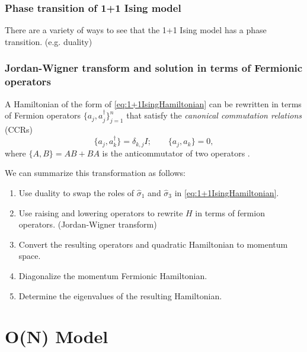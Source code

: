\documentclass[11pt,reqno]{amsart}
\begin{document}
    \subsubsection{Phase transition of 1+1 Ising model}
    
    There are a variety of ways to see that the 1+1 Ising model has a phase transition.
    (e.g. duality) \cite{KogutGaugeSummary}
    
    \subsubsection{Jordan-Wigner transform and solution in terms of Fermionic operators}
    
    A Hamiltonian of the form of \cref{eq:1+1IsingHamiltonian} can be rewritten in terms of Fermion operators $\{a_j,a^\dagger_j\}_{j=1}^n$ that satisfy the \emph{canonical commutation relations} (CCRs) 
    \[ \{a_j,a_k^\dagger \} = \delta_{k,j}I; \qquad \{a_j,a_k \} =0, \]
    where $\{A,B\} = AB + BA$ is the anticommutator of two operators \cite{KogutGaugeSummary,nielsen_fermions,SchultzMattisLieb64}.
    
    We can summarize this transformation as follows:
    \begin{enumerate}
    	\item Use duality to swap the roles of $\hat{\sigma}_1$ and $\hat{\sigma}_3$ in \cref{eq:1+1IsingHamiltonian}.
    	\item Use raising and lowering operators to rewrite $H$ in terms of fermion operators. (Jordan-Wigner transform)
    	\item Convert the resulting operators and quadratic Hamiltonian to momentum space.
    	\item Diagonalize the momentum Fermionic Hamiltonian.
    	\item Determine the eigenvalues of the resulting Hamiltonian.
    \end{enumerate}
	
	\section{O(N) Model}
	
\end{document}
